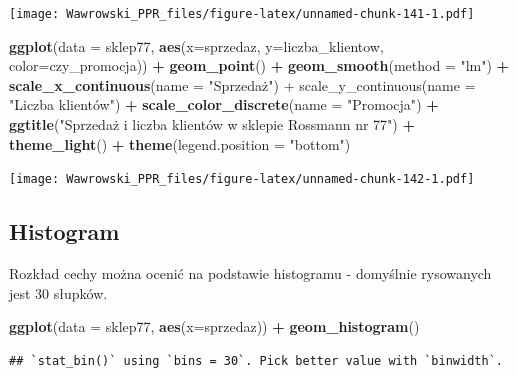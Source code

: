 \documentclass[]{book}
\newenvironment{Shaded}{\begin{snugshade}}{\end{snugshade}}
\newcommand{\KeywordTok}[1]{\textcolor[rgb]{0.13,0.29,0.53}{\textbf{#1}}}
\newcommand{\DataTypeTok}[1]{\textcolor[rgb]{0.13,0.29,0.53}{#1}}
\newcommand{\StringTok}[1]{\textcolor[rgb]{0.31,0.60,0.02}{#1}}
\newcommand{\OperatorTok}[1]{\textcolor[rgb]{0.81,0.36,0.00}{\textbf{#1}}}
\newcommand{\NormalTok}[1]{#1}
\begin{document}
\texttt{[image: Wawrowski\_PPR\_files/figure-latex/unnamed-chunk-141-1.pdf]}

\begin{Shaded}
\begin{Highlighting}[]
\KeywordTok{ggplot}\NormalTok{(}\DataTypeTok{data =}\NormalTok{ sklep77, }\KeywordTok{aes}\NormalTok{(}\DataTypeTok{x=}\NormalTok{sprzedaz, }\DataTypeTok{y=}\NormalTok{liczba_klientow, }\DataTypeTok{color=}\NormalTok{czy_promocja)) }\OperatorTok{+}
\StringTok{  }\KeywordTok{geom_point}\NormalTok{() }\OperatorTok{+}
\StringTok{  }\KeywordTok{geom_smooth}\NormalTok{(}\DataTypeTok{method =} \StringTok{"lm"}\NormalTok{) }\OperatorTok{+}
\StringTok{  }\KeywordTok{scale_x_continuous}\NormalTok{(}\DataTypeTok{name =} \StringTok{"Sprzedaż") +}
\StringTok{  scale_y_continuous(name = "}\NormalTok{Liczba klientów") }\OperatorTok{+}
\StringTok{  }\KeywordTok{scale_color_discrete}\NormalTok{(}\DataTypeTok{name =} \StringTok{"Promocja"}\NormalTok{) }\OperatorTok{+}
\StringTok{  }\KeywordTok{ggtitle}\NormalTok{(}\StringTok{"Sprzedaż i liczba klientów w sklepie Rossmann nr 77"}\NormalTok{) }\OperatorTok{+}
\StringTok{  }\KeywordTok{theme_light}\NormalTok{() }\OperatorTok{+}
\StringTok{  }\KeywordTok{theme}\NormalTok{(}\DataTypeTok{legend.position =} \StringTok{"bottom"}\NormalTok{)}
\end{Highlighting}
\end{Shaded}

\texttt{[image: Wawrowski\_PPR\_files/figure-latex/unnamed-chunk-142-1.pdf]}

\subsection{Histogram}\label{histogram}

Rozkład cechy można ocenić na podstawie histogramu - domyślnie
rysowanych jest 30 słupków.

\begin{Shaded}
\begin{Highlighting}[]
\KeywordTok{ggplot}\NormalTok{(}\DataTypeTok{data =}\NormalTok{ sklep77, }\KeywordTok{aes}\NormalTok{(}\DataTypeTok{x=}\NormalTok{sprzedaz)) }\OperatorTok{+}
\StringTok{  }\KeywordTok{geom_histogram}\NormalTok{()}
\end{Highlighting}
\end{Shaded}

\begin{verbatim}
## `stat_bin()` using `bins = 30`. Pick better value with `binwidth`.
\end{verbatim}
\end{document}
